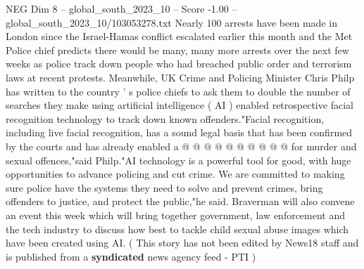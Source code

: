 \begin{textsample}{NEG Dim 8 – global\_south\_2023\_10 – Score -1.00 – global\_south\_2023\_10/103053278.txt}
Nearly 100 arrests have been made in London since the Israel-Hamas conflict escalated earlier this month and the Met Police chief predicts there would be many, many more arrests over the next few weeks as police track down people who had breached public order and terrorism laws at recent protests.
Meanwhile, UK Crime and Policing Minister Chris Philp has written to the country ' s police chiefs to ask them to double the number of searches they make using artificial intelligence ( AI ) enabled retrospective facial recognition technology to track down known offenders."Facial recognition, including live facial recognition, has a sound legal basis that has been confirmed by the courts and has already enabled a @ @ @ @ @ @ @ @ @ @ for murder and sexual offences,"said Philp."AI technology is a powerful tool for good, with huge opportunities to advance policing and cut crime.
We are committed to making sure police have the systems they need to solve and prevent crimes, bring offenders to justice, and protect the public,"he said.
Braverman will also convene an event this week which will bring together government, law enforcement and the tech industry to discuss how best to tackle child sexual abuse images which have been created using AI. ( This story has not been edited by News18 staff and is published from a \textbf{syndicated} news agency feed - PTI )

\end{textsample}
